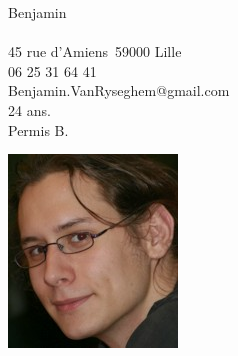 \documentclass{curve}
\title{}
\begin{document}
\begin{minipage}{7cm}
\large
Benjamin \\
\normalsize
\\
45 rue d'Amiens\
59000 Lille\\
06 25 31 64 41\\
Benjamin.VanRyseghem@gmail.com\\
24 ans.\\
Permis B.
\end{minipage}
\hfill
\begin{minipage}{5cm}
  \begin{flushright}
  \includegraphics[height=20ex]{Moi}
  \end{flushright}
\end{minipage}
\vspace{-0.5cm}
\maketitle
\vspace{-1cm}
\end{document}
